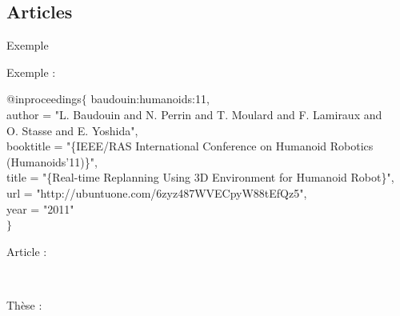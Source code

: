 \documentclass{beamer}
\begin{document}
\subsection*{Articles}

\begin{frame}{Exemple}

  Exemple :\\
  \vspace{2mm}
  \begin{scriptsize}
    @inproceedings$\lbrace$ baudouin\string:humanoids\string:11,\\
    \hspace{5mm} author = "L. Baudouin and N. Perrin and T. Moulard and F. Lamiraux and\\
    \hspace{19mm} O. Stasse and E. Yoshida",\\
    \hspace{5mm} booktitle = "\{IEEE/RAS International Conference on Humanoid Robotics\\
    \hspace{22mm} (Humanoids'11)\}",\\
    \hspace{5mm} title = "\{Real-time Replanning Using 3D Environment for Humanoid Robot\}",\\
    \hspace{5mm} url = "http://ubuntuone.com/6zyz487WVECpyW88tEfQz5",\\
    \hspace{5mm} year = "2011"\\
    \vspace{-2mm}
    $\rbrace$
  \end{scriptsize}
  \vspace{5mm}

  Article :\\
  \begin{scriptsize}
    \mbox{
      \citeauthor{baudouin:humanoids:11}
      \cite{baudouin:humanoids:11}
    }
  \end{scriptsize}

  Thèse :\\
  \begin{scriptsize}
    \mbox{
      \citeauthor{Courbon09PhD}
      \cite{Courbon09PhD}}
  \end{scriptsize}
  \vspace{5mm}

\end{frame}
\end{document}
